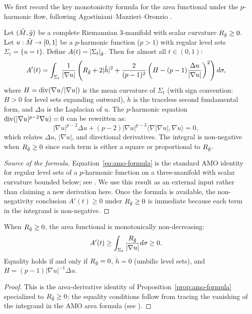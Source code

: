We first record the key monotonicity formula for the area functional under the $p$-harmonic flow, following Agostiniani--Mazzieri--Oronzio \cite{amo2022}.

\begin{proposition}\label{prop:amo-formula}
Let $(\tilde{M}, \tilde{g})$ be a complete Riemannian 3-manifold with scalar curvature $R_{\tilde{g}} \geq 0$. Let $u: \tilde{M} \to [0, 1]$ be a $p$-harmonic function ($p > 1$) with regular level sets $\Sigma_t = \{u = t\}$. Define $A(t) = |\Sigma_t|_{\tilde{g}}$. Then for almost all $t \in (0,1)$:
\begin{equation}\label{eq:amo-formula}
A'(t) = \int_{\Sigma_t} \frac{1}{|\nabla u|}\left(R_{\tilde{g}} + 2|\mathring{h}|^2 + \frac{2}{(p-1)^2}\left(H - (p-1)\frac{\Delta u}{|\nabla u|}\right)^2\right) d\sigma,
\end{equation}
where $H = \mathrm{div}(\nabla u/|\nabla u|)$ is the mean curvature of $\Sigma_t$ (with sign convention: $H > 0$ for level sets expanding outward), $\mathring{h}$ is the traceless second fundamental form, and $\Delta u$ is the Laplacian of $u$. The $p$-harmonic equation $\mathrm{div}(|\nabla u|^{p-2}\nabla u) = 0$ can be rewritten as:
\[
|\nabla u|^{p-2}\Delta u + (p-2)|\nabla u|^{p-3}\langle \nabla|\nabla u|, \nabla u\rangle = 0,
\]
which relates $\Delta u$, $|\nabla u|$, and directional derivatives. The integral is non-negative when $R_{\tilde{g}} \geq 0$ since each term is either a square or proportional to $R_{\tilde{g}}$.
\end{proposition}

\begin{proof}[Source of the formula]
Equation~\eqref{eq:amo-formula} is the standard AMO identity for regular level sets of a $p$-harmonic function on a three-manifold with scalar curvature bounded below; see \cite[Theorem~3.1 and Section~4]{amo2022}. We use this result as an external input rather than claiming a new derivation here. Once the formula is available, the non-negativity conclusion $A'(t)\ge0$ under $R_{\tilde{g}}\ge0$ is immediate because each term in the integrand is non-negative.
\end{proof}

\begin{corollary}\label{cor:area-mono}
When $R_{\tilde{g}} \geq 0$, the area functional is monotonically non-decreasing:
\[
A'(t) \geq \int_{\Sigma_t} \frac{R_{\tilde{g}}}{|\nabla u|} d\sigma \geq 0.
\]
Equality holds if and only if $R_{\tilde{g}} = 0$, $\mathring{h} = 0$ (umbilic level sets), and $H = (p-1)|\nabla u|^{-1}\Delta u$.
\end{corollary}
\begin{proof}
This is the area-derivative identity of Proposition~\ref{prop:amo-formula} specialized to $R_{\tilde{g}}\geq 0$; the equality conditions follow from tracing the vanishing of the integrand in the AMO area formula (see \cite[Section~3]{amo2022}).
\end{proof}

